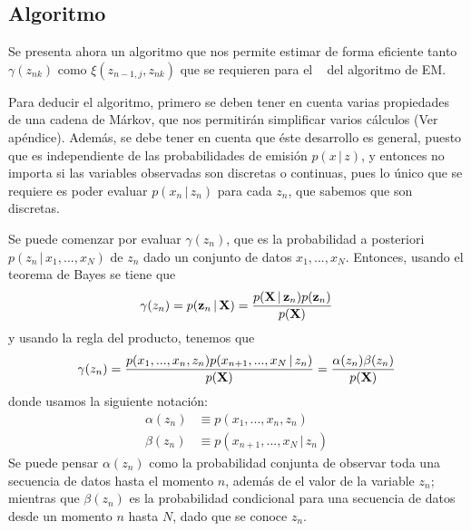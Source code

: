 \subsection{Algoritmo \abf}

Se presenta ahora un algoritmo que nos permite estimar de forma eficiente tanto $\gamma(z_{nk})$ como $\xi(z_{n-1, j}, z_{nk})$ que se requieren para el \estep~ del algoritmo de \ac{EM}.

Para deducir el algoritmo, primero se deben tener en cuenta varias propiedades de una cadena de Márkov, que nos permitirán simplificar varios cálculos (Ver apéndice). Además, se debe tener en cuenta que éste desarrollo es general, puesto que es independiente de las probabilidades de emisión $p(x \,|\, z)$, y entonces no importa si las variables observadas son discretas o continuas, pues lo único que se requiere es poder evaluar $p(x_n \,|\, z_n)$ para cada $z_n$, que sabemos que son discretas.

Se puede comenzar por evaluar $\gamma(z_n)$, que es la probabilidad a posteriori $p(z_n \,|\, x_1, ..., x_N)$ de $z_n$ dado un conjunto de datos $x_1, ..., x_N$. Entonces, usando el teorema de Bayes se tiene que
\begin{equation}
  \gamma(z_n) = p(\textbf{z}_n \,|\, \textbf{X}) = 
    \frac{p(\textbf{X} \,|\, \textbf{z}_n) p(\textbf{z}_n)}{p(\textbf{X})} 
  \label{eqn:3-10}
\end{equation}
y usando la regla del producto, tenemos que
\begin{equation}
  \gamma(z_n) = \frac{
    p(x_1, ..., x_n, z_n) p(x_{n+1}, ..., x_N \,|\, z_n) 
    }
    {p(\textbf{X})} = \frac{\alpha(z_n) \beta(z_n)}{p(\textbf{X})}
  \label{eqn:3-11}
\end{equation}
donde usamos la siguiente notación:
\begin{align}
  \alpha(z_n) &\equiv p(x_1, ..., x_n, z_n) 
\label{eqn:3-12} \\
  \beta(z_n) &\equiv p(x_{n+1}, ..., x_N \,|\, z_n) 
  \label{eqn:3-13}
\end{align}
Se puede pensar $\alpha(z_n)$ como la probabilidad conjunta de observar toda una secuencia de datos hasta el momento $n$, además de el valor de la variable $z_n$; mientras que $\beta(z_n)$ es la probabilidad condicional para una secuencia de datos desde un momento $n$ hasta $N$, dado que se conoce $z_n$. 

